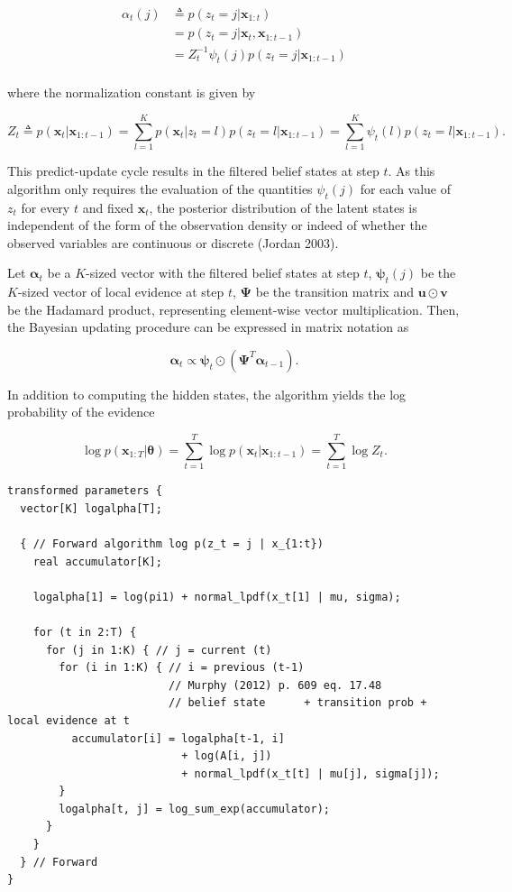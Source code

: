 \documentclass[]{article}
\newcommand{\mat}[1]{\mathbf{#1}}
\begin{document}
\begin{align*}
\label{eq:filtered-beliefstate}
\alpha_t(j) 
  & \triangleq  p(z_t = j | \mat{x}_{1:t}) \\
  &= p(z_t = j | \mat{x}_{t}, \mat{x}_{1:t-1}) \\
  &= Z_t^{-1} \psi_t(j) p(z_t = j | \mat{x}_{1:t-1}) \\
\end{align*}

where the normalization constant is given by

\[
Z_t
  \triangleq  p(\mat{x}_t | \mat{x}_{1:t-1})
  = \sum_{l=1}^{K}{p(\mat{x}_{t} | z_t = l) p(z_t = l | \mat{x}_{1:t-1})}
  = \sum_{l=1}^{K}{\psi_t(l) p(z_t = l | \mat{x}_{1:t-1})}.
\]

This predict-update cycle results in the filtered belief states at step
\(t\). As this algorithm only requires the evaluation of the quantities
\(\psi_t(j)\) for each value of \(z_t\) for every \(t\) and fixed
\(\mat{x}_t\), the posterior distribution of the latent states is
independent of the form of the observation density or indeed of whether
the observed variables are continuous or discrete (Jordan 2003).

Let \(\mat{\alpha}_t\) be a \(K\)-sized vector with the filtered belief
states at step \(t\), \(\mat{\psi}_t(j)\) be the \(K\)-sized vector of
local evidence at step \(t\), \(\mat{\Psi}\) be the transition matrix
and \(\mat{u} \odot \mat{v}\) be the Hadamard product, representing
element-wise vector multiplication. Then, the Bayesian updating
procedure can be expressed in matrix notation as

\[
\mat{\alpha}_t \propto \mat{\psi}_t \odot (\mat{\Psi}^T \mat{\alpha}_{t-1}).
\]

In addition to computing the hidden states, the algorithm yields the log
probability of the evidence

\[
\log p(\mat{x}_{1:T} | \mat{\theta}) = \sum_{t=1}^{T}{\log p(\mat{x}_{t} | \mat{x}_{1:t-1})} = \sum_{t=1}^{T}{\log Z_t}.
\]

\begin{verbatim}
transformed parameters {
  vector[K] logalpha[T];

  { // Forward algorithm log p(z_t = j | x_{1:t})
    real accumulator[K];

    logalpha[1] = log(pi1) + normal_lpdf(x_t[1] | mu, sigma);

    for (t in 2:T) {
      for (j in 1:K) { // j = current (t)
        for (i in 1:K) { // i = previous (t-1)
                         // Murphy (2012) p. 609 eq. 17.48
                         // belief state      + transition prob + local evidence at t
          accumulator[i] = logalpha[t-1, i] 
                           + log(A[i, j]) 
                           + normal_lpdf(x_t[t] | mu[j], sigma[j]);
        }
        logalpha[t, j] = log_sum_exp(accumulator);
      }
    }
  } // Forward
}
\end{verbatim}
\end{document}
